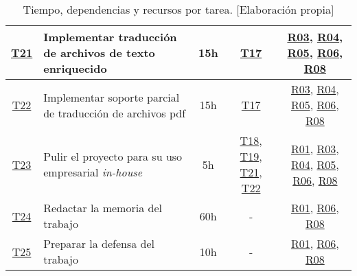 \begin{landscape}
\begin{table}
\begin{tabular}{ | c | l | c | c | c | }
        \hline
        \hyperref[T21]{T21} & Implementar traducción de archivos de texto enriquecido & 15h & \hyperref[T17]{T17} & \hyperref[R03]{R03}, \hyperref[R04]{R04}, \hyperref[R05]{R05}, \hyperref[R06]{R06}, \hyperref[R08]{R08} \\
        \hline
        \hyperref[T22]{T22} & Implementar soporte parcial de traducción de archivos pdf & 15h & \hyperref[T17]{T17} & \hyperref[R03]{R03}, \hyperref[R04]{R04}, \hyperref[R05]{R05}, \hyperref[R06]{R06}, \hyperref[R08]{R08} \\
        \hline
        \hyperref[T23]{T23} & Pulir el proyecto para su uso empresarial \textit{in-house} & 5h & \hyperref[T18]{T18}, \hyperref[T19]{T19}, \hyperref[T20]{T21}, \hyperref[T22]{T22} & \hyperref[R01]{R01}, \hyperref[R03]{R03}, \hyperref[R04]{R04}, \hyperref[R05]{R05}, \hyperref[R06]{R06}, \hyperref[R08]{R08} \\
        \hline
        \hyperref[T24]{T24} & Redactar la memoria del trabajo & 60h & - & \hyperref[R01]{R01}, \hyperref[R06]{R06}, \hyperref[R08]{R08} \\
        \hline
        \hyperref[T25]{T25} & Preparar la defensa del trabajo & 10h & - & \hyperref[R01]{R01}, \hyperref[R06]{R06}, \hyperref[R08]{R08} \\
        \hline
    \end{tabular}
    \caption{Tiempo, dependencias y recursos por tarea. [Elaboración propia]}
    \end{table}
\end{landscape}
\restoregeometry